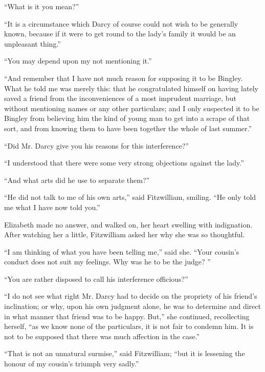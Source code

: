 \documentclass[10pt]{book}
\begin{document}
   “What is it you mean?”
  

   “It is a circumstance which Darcy of course could not wish to be
generally known, because if it were to get round to the lady’s family it
would be an unpleasant thing.”
  

   “You may depend upon my not mentioning it.”
  

   “And remember that I have not much reason for supposing it to be
Bingley. What he told me was merely this: that he congratulated himself
on having lately saved a friend from the inconveniences of a most
imprudent marriage, but without mentioning names or any other
particulars; and I only suspected it to be Bingley from believing him
the kind of young man to get into a scrape of that sort, and from
knowing them to have been together the whole of last summer.”
  

   “Did Mr. Darcy give you his reasons for this interference?”
  

   “I understood that there were some very strong objections against the
lady.”
  

   “And what arts did he use to separate them?”
  

   “He did not talk to me of his own arts,” said Fitzwilliam, smiling. “He
only told me what I have now told you.”
  

   Elizabeth made no answer, and walked on, her heart swelling with
indignation. After watching her a little, Fitzwilliam asked her why she
was so thoughtful.
  

   “I am thinking of what you have been telling me,” said she. “Your
cousin’s conduct does not suit my feelings. Why was he to be the
judge?
   ”
  

   “You are rather disposed to call his interference officious?”
  

   “I do not see what right Mr. Darcy had to decide on the propriety of his
friend’s inclination; or why, upon his own judgment alone, he was to
determine and direct in what manner that friend was to be happy. But,”
she continued, recollecting herself, “as we know none of the
particulars, it is not fair to condemn him. It is not to be supposed
that there was much affection in the case.”
  

   “That is not an unnatural surmise,” said Fitzwilliam; “but it is
lessening the honour of my cousin’s triumph very sadly.”
  
\end{document}
